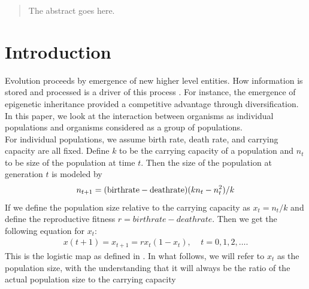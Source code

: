 \documentclass[conference]{IEEEtran}
\begin{document}
\maketitle

\begin{abstract}
The abstract goes here.
\end{abstract}





%
\IEEEpeerreviewmaketitle



\section{Introduction}
\noindent Evolution proceeds by emergence of new higher level entities.   How information is stored and processed is a driver of this process \cite{Walker}.   For instance, the emergence of epigenetic inheritance provided a competitive advantage through diversification.  
In this paper, we look at the interaction between organisms as individual  populations and organisms considered as a group of populations. \\ 

\noindent For individual populations, we assume birth rate, death rate, and  carrying capacity are all fixed.  Define $k$ to be the carrying capacity of a population and $n_t$ to be size of the population at time $t$. Then the size of the population at generation $t$ is modeled by 
\begin{eqnarray}
n_{t+1} = (\textnormal{birthrate} - \textnormal{deathrate}) (k n_t - n_t^2) / k 
\end{eqnarray}
If we define the population size relative to the carrying capacity as  $x_t = n_t / k$ and define the reproductive fitness  $r = birthrate - deathrate$.  Then we  get the following equation for $x_t$: 
\begin{eqnarray}
x(t+1) = x_{t+1} = r  x_t (1 - x_t), \ \ \ \ \  t=0, 1, 2, \ldots . 
\label{logistic}
\end{eqnarray}
This is the logistic map as defined in \cite{Mitchell}.  In what follows, we will refer to $x_t$ as the population size, with the understanding that it will always be the ratio of the actual population size to the carrying capacity
\end{document}
